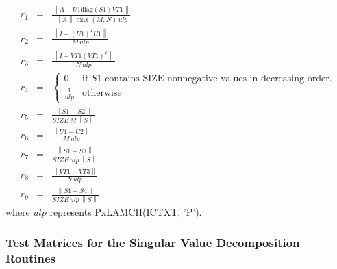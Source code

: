 \documentclass[11pt]{report}
\newcommand{\leftnorm}{\left\|}
\newcommand{\rightnorm}{\right\|}
\begin{document}
\begin{eqnarray}
   r_1 &=& \frac{ \leftnorm A - U1 \mbox{diag}(S1) VT1 \rightnorm }
                { \leftnorm A\rightnorm \max(M,N) \, ulp} \nonumber\\
   r_2 &=& \frac{ \leftnorm I - (U1)^T U1 \rightnorm }
                { M \, ulp} \nonumber\\
   r_3 &=& \frac{ \leftnorm I - VT1 (VT1)^T \rightnorm }
                { N \, ulp} \nonumber\\
   r_4 &=&  \left\{
                  \begin{array}{ll}
                    0 & \mbox{if $S1$ contains SIZE nonnegative values
                          in decreasing order.} \\
                    \frac{1}{ulp} & \mbox{otherwise}
                  \end{array}
             \right. \nonumber\\
   r_5 &=& \frac{ \leftnorm S1 - S2 \rightnorm }
                { SIZE \, M \leftnorm S\rightnorm} \nonumber\\
   r_6 &=& \frac{ \leftnorm U1 - U2 \rightnorm }
                { M \, ulp} \nonumber\\
   r_7 &=& \frac{ \leftnorm S1 - S3 \rightnorm }
                { SIZE \, ulp \leftnorm S\rightnorm } \nonumber\\
   r_8 &=& \frac{ \leftnorm VT1 - VT3 \rightnorm }
                { N \, ulp} \nonumber\\
   r_9 &=& \frac{ \leftnorm S1 - S4 \rightnorm }
                { SIZE \, ulp \, \leftnorm S\rightnorm} \nonumber
\end{eqnarray}
where $ulp$ represents PxLAMCH(ICTXT, 'P').

\subsubsection{Test Matrices for the Singular Value Decomposition Routines}
\label{svd_test_matrices}
\end{document}
